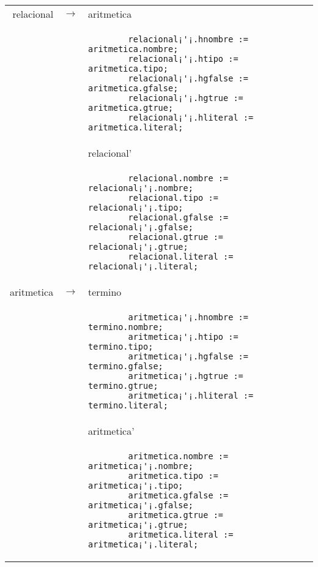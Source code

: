 \small
\begin{tabular}{r c p{}}

		relacional			& $\longrightarrow$ 	& aritmetica \\
								&					& \begin{lstlisting}
		relacional¡'¡.hnombre := aritmetica.nombre;
        relacional¡'¡.htipo := aritmetica.tipo;
        relacional¡'¡.hgfalse := aritmetica.gfalse;
        relacional¡'¡.hgtrue := aritmetica.gtrue;
        relacional¡'¡.hliteral := aritmetica.literal;
                    									\end{lstlisting} \\
								&					& relacional' \\
								&					& \begin{lstlisting}
		relacional.nombre := relacional¡'¡.nombre;
        relacional.tipo := relacional¡'¡.tipo;
        relacional.gfalse := relacional¡'¡.gfalse;
        relacional.gtrue := relacional¡'¡.gtrue;
        relacional.literal := relacional¡'¡.literal;
                    									\end{lstlisting} \\
									
									
		aritmetica			& $\longrightarrow$ 	& termino \\
								&					& \begin{lstlisting}
		aritmetica¡'¡.hnombre := termino.nombre;
        aritmetica¡'¡.htipo := termino.tipo;
        aritmetica¡'¡.hgfalse := termino.gfalse;
        aritmetica¡'¡.hgtrue := termino.gtrue;
        aritmetica¡'¡.hliteral := termino.literal;
                    									\end{lstlisting} \\
								&					& aritmetica' \\
								&					& \begin{lstlisting}
		aritmetica.nombre := aritmetica¡'¡.nombre;
        aritmetica.tipo := aritmetica¡'¡.tipo;
        aritmetica.gfalse := aritmetica¡'¡.gfalse;
        aritmetica.gtrue := aritmetica¡'¡.gtrue;
        aritmetica.literal := aritmetica¡'¡.literal;
                    									\end{lstlisting} \\
									

\end{tabular}

